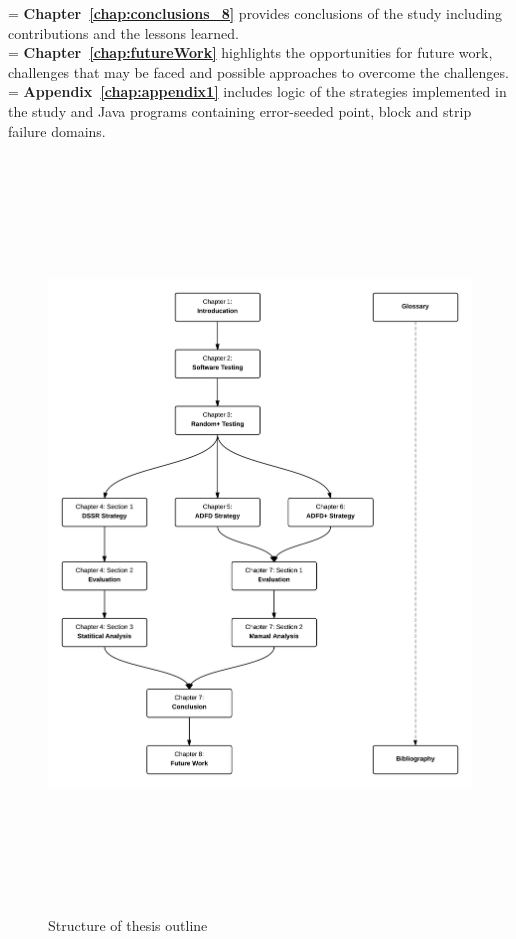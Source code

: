\hangindent=\parindent
{}
\noindent
\textbf{Chapter~\ref{chap:conclusions_8}} provides conclusions of the study including contributions and the lessons learned.\\

\hangindent=\parindent
{}
\noindent
\textbf{Chapter~\ref{chap:futureWork}} highlights the opportunities for future work, challenges that may be faced and possible approaches to overcome the challenges.\\


 \hangindent=\parindent
 \noindent
 \textbf{Appendix~\ref{chap:appendix1}} includes logic of the strategies implemented in the study and Java programs containing error-seeded point, block and strip failure domains.\\

\newpage
\begin{figure}[h]
	\centering
		\includegraphics[width=16cm, height=20cm ]{chapter1/thesisOutline2.png}
		\bigskip
		\caption{Structure of thesis outline}
	\label{fig:thesisOutline}
\end{figure}



